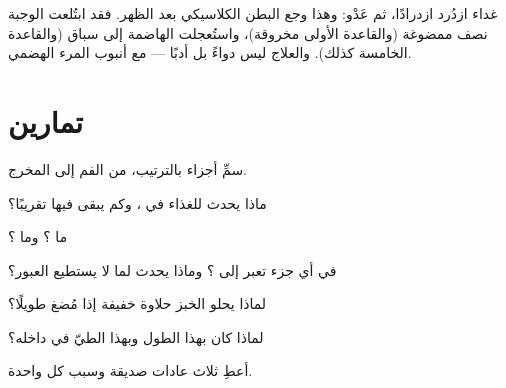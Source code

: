 \begin{example}\label{ex:g4:journey-of-food:ache}
غداء ازدُرد ازدرادًا، ثم عَدْو: وهذا وجع البطن الكلاسيكي بعد
الظهر. فقد ابتُلعت الوجبة نصف ممضوغة (والقاعدة الأولى مخروقة)،
واستُعجلت  الهاضمة إلى سباق (والقاعدة الخامسة كذلك). والعلاج
ليس دواءً بل أدبًا --- مع أنبوب المرء الهضمي.
\end{example}

\section{تمارين}

\begin{exercise}[$\star$]\label{exo:g4:journey-of-food:1}
سمِّ أجزاء  بالترتيب، من الفم إلى المخرج.
\end{exercise}

\begin{exercise}[$\star$]\label{exo:g4:journey-of-food:2}
ماذا يحدث للغذاء في ، وكم يبقى فيها تقريبًا؟
\end{exercise}

\begin{exercise}[$\star$]\label{exo:g4:journey-of-food:3}
ما ؟ وما ؟
\end{exercise}

\begin{exercise}[$\star$]\label{exo:g4:journey-of-food:4}
في أي جزء تعبر  إلى ؟ وماذا يحدث لما لا يستطيع
العبور؟
\end{exercise}

\begin{exercise}[$\star$]\label{exo:g4:journey-of-food:5}
لماذا يحلو الخبز حلاوة خفيفة إذا مُضغ طويلًا؟
\end{exercise}

\begin{exercise}[$\star$]\label{exo:g4:journey-of-food:6}
لماذا كان  بهذا الطول وبهذا الطيّ في داخله؟
\end{exercise}

\begin{exercise}[$\star$]\label{exo:g4:journey-of-food:7}
أعطِ ثلاث عادات صديقة  وسبب كل واحدة.
\end{exercise}

